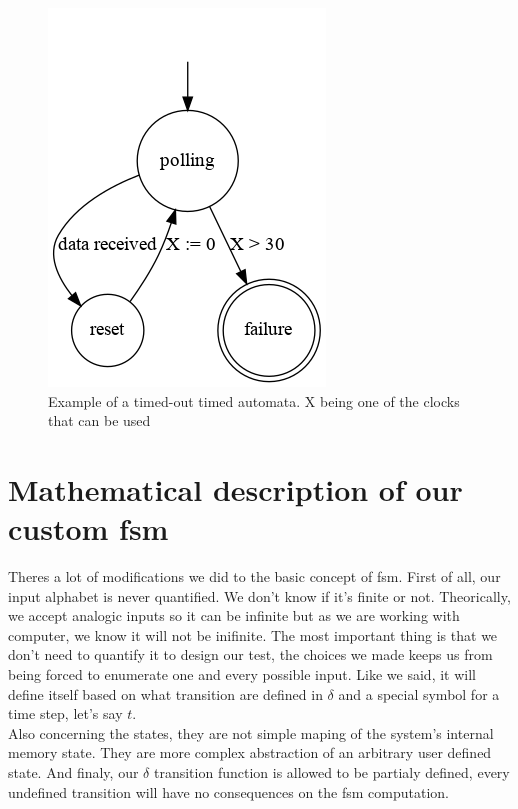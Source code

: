 \documentclass[12pt]{article}
\begin{document}
\begin{figure}
    \centering
    \includegraphics[scale=0.8]{timed_automata.png}
    \caption{Example of a timed-out timed automata. X being one of the clocks that can be used}
    \label{timed_automata_e1}
\end{figure}

\section{Mathematical description of our custom \gls{fsm}}

Theres a lot of modifications we did to the basic concept of \gls{fsm}. First of all, our input alphabet is never quantified. We don't know if it's finite or not. Theorically, we accept analogic inputs so it can be infinite but as we are working with computer, we know it will not be inifinite. The most important thing is that we don't need to quantify it to design our test, the choices we made keeps us from being forced to enumerate one and every possible input. Like we said, it will define itself based on what transition are defined in $\delta$ and a special symbol for a time step, let's say $t$.\\

Also concerning the states, they are not simple maping of the system's internal memory state. They are more complex abstraction of an arbitrary user defined state. And finaly, our $\delta$ transition function is allowed to be partialy defined, every undefined transition will have no consequences on the \gls{fsm} computation.


\end{document}

